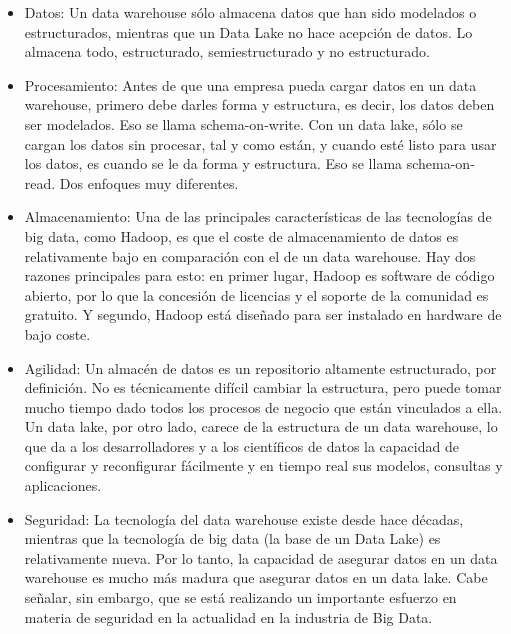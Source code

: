 \documentclass[11pt,a4paper]{article}
\begin{document}
		\begin{itemize}
			
			\item Datos: Un data warehouse sólo almacena datos que han sido modelados o estructurados, mientras que un Data Lake no hace acepción de datos. Lo almacena todo, estructurado, semiestructurado y no estructurado.

			\item Procesamiento: Antes de que una empresa pueda cargar datos en un data warehouse, primero debe darles forma y estructura, es decir, los datos deben ser modelados. Eso se llama schema-on-write. Con un data lake, sólo se cargan los datos sin procesar, tal y como están, y cuando esté listo para usar los datos, es cuando se le da forma y estructura. Eso se llama schema-on-read. Dos enfoques muy diferentes.

			\item Almacenamiento: Una de las principales características de las tecnologías de big data, como Hadoop, es que el coste de almacenamiento de datos es relativamente bajo en comparación con el de un data warehouse. Hay dos razones principales para esto: en primer lugar, Hadoop es software de código abierto, por lo que la concesión de licencias y el soporte de la comunidad es gratuito. Y segundo, Hadoop está diseñado para ser instalado en hardware de bajo coste.

			\item Agilidad: Un almacén de datos es un repositorio altamente estructurado, por definición. No es técnicamente difícil cambiar la estructura, pero puede tomar mucho tiempo dado todos los procesos de negocio que están vinculados a ella. Un data lake, por otro lado, carece de la estructura de un data warehouse, lo que da a los desarrolladores y a los científicos de datos la capacidad de configurar y reconfigurar fácilmente y en tiempo real sus modelos, consultas y aplicaciones.

			\item Seguridad: La tecnología del data warehouse existe desde hace décadas, mientras que la tecnología de big data (la base de un Data Lake) es relativamente nueva. Por lo tanto, la capacidad de asegurar datos en un data warehouse es mucho más madura que asegurar datos en un data lake. Cabe señalar, sin embargo, que se está realizando un importante esfuerzo en materia de seguridad en la actualidad en la industria de Big Data. \cite{DWarehouseVsDLake02:Online}
		\end{itemize}
					
\end{document}
